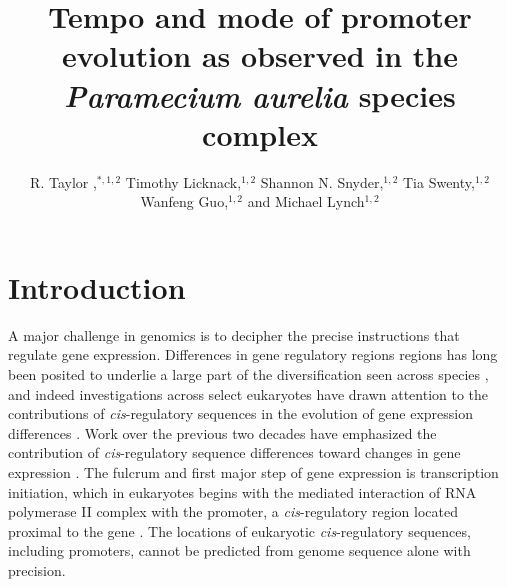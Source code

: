 \documentclass[nogrid]{MBE}%
\begin{document}
\title{Tempo and mode of promoter evolution as observed in the \textit{Paramecium aurelia} species complex}

\author[Raborn et al.]{R. Taylor ,$^{\ast,1,2}$ Timothy Licknack,$^{1,2}$ Shannon N. Snyder,$^{1,2}$ Tia Swenty,$^{1,2}$ Wanfeng Guo,$^{1,2}$ and Michael Lynch$^{1,2}$}

\address{$^{1}$Biodesign Institute Center for the Mechanisms of Evolution\\
$^{2}$School of Life Sciences\\
Arizona State University, 797 E. Tyler Street, Tempe, AZ 85281}







\maketitle


\section{{Introduction}\label{sec:Intro}}

A major challenge in genomics is to decipher the precise instructions that regulate gene expression. Differences in gene regulatory regions regions has long been posited to underlie a large part of the diversification seen across species \citep{King.1975}, and indeed investigations across select eukaryotes have drawn attention to the contributions of \textit{cis}-regulatory sequences in the evolution of gene expression differences \citep{Wittkopp.2008, Wittkopp.2011, Siepel.2014}. Work over the previous two decades have emphasized the contribution of \textit{cis}-regulatory sequence differences toward changes in gene expression \citep{Wittkopp.2004}. The fulcrum and first major step of gene expression is transcription initiation, which in eukaryotes begins with the mediated interaction of RNA polymerase II complex with the promoter, a \textit{cis}-regulatory region located proximal to the gene \citep{Kadonaga.2012}. The locations of eukaryotic \textit{cis}-regulatory sequences, including promoters, cannot be predicted from genome sequence alone with precision.\\
\end{document}
